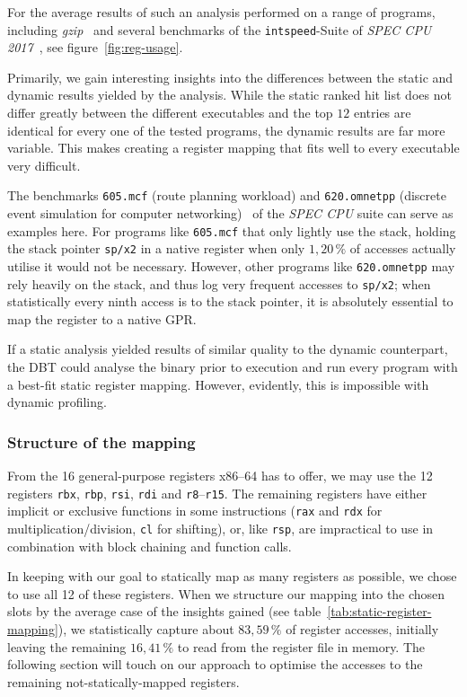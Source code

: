 For the average results of such an analysis performed on a range of programs, including \textit{gzip}~\cite{gzip} and several benchmarks of the \texttt{intspeed}-Suite of \textit{SPEC CPU 2017}~\cite{spec-cpu-2017}, see figure~\ref{fig:reg-usage}.

Primarily, we gain interesting insights into the differences between the static and dynamic results yielded by the analysis.
While the static ranked hit list does not differ greatly between the different executables and the top $12$ entries are identical for every one of the tested programs, the dynamic results are far more variable.
This makes creating a register mapping that fits well to every executable very difficult.

The benchmarks \texttt{605.mcf} (route planning workload) and \texttt{620.omnetpp} (discrete event simulation for computer networking)~\cite{spec-cpu-doc} of the \textit{SPEC CPU} suite can serve as examples here.
For programs like \texttt{605.mcf} that only lightly use the stack, holding the stack pointer \texttt{sp/x2} in a native register when only $1,20\,\%$ of accesses actually utilise it would not be necessary.
However, other programs like \texttt{620.omnetpp} may rely heavily on the stack, and thus log very frequent accesses to \texttt{sp/x2};
when statistically every ninth access is to the stack pointer, it is absolutely essential to map the register to a native GPR\@.

If a static analysis yielded results of similar quality to the dynamic counterpart, the DBT could analyse the binary prior to execution and run every program with a best-fit static register mapping.
However, evidently, this is impossible with dynamic profiling.


\subsubsection{Structure of the mapping}
From the 16 general-purpose registers x86--64 has to offer, we may use the 12 registers \texttt{rbx}, \texttt{rbp}, \texttt{rsi}, \texttt{rdi} and \texttt{r8}--\texttt{r15}.
The remaining registers have either implicit or exclusive functions in some instructions (\texttt{rax} and \texttt{rdx} for multiplication/division, \texttt{cl} for shifting), or, like \texttt{rsp}, are impractical to use in combination with block chaining and function calls.

In keeping with our goal to statically map as many registers as possible, we chose to use all 12 of these registers.
When we structure our mapping into the chosen slots by the average case of the insights gained (see table~\vref{tab:static-register-mapping}), we statistically capture about $83,59\,\%$ of register accesses, initially leaving the remaining $16,41\,\%$ to read from the register file in memory.
The following section will touch on our approach to optimise the accesses to the remaining not-statically-mapped registers.

